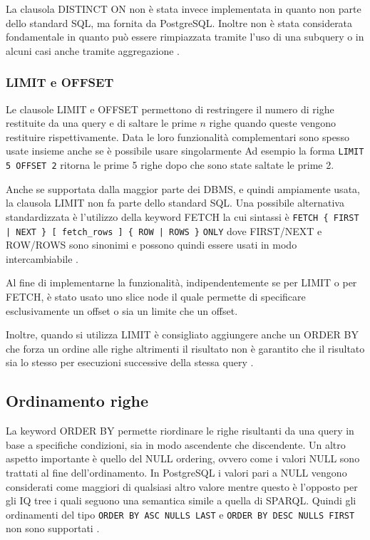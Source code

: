 La clausola DISTINCT ON non è stata invece implementata in quanto non parte dello standard SQL, ma fornita da PostgreSQL. Inoltre non è stata considerata fondamentale in quanto
può essere rimpiazzata tramite l'uso di una subquery o in alcuni casi anche tramite aggregazione \cite{PGDistinct}.
\subsubsection*{LIMIT e OFFSET}
Le clausole LIMIT e OFFSET permettono di restringere il numero di righe restituite da una query e di saltare le prime $n$ righe quando queste vengono restituire rispettivamente.
Data le loro funzionalità complementari sono spesso usate insieme anche se è possibile usare singolarmente
Ad esempio la forma \verb+LIMIT 5 OFFSET 2+ ritorna le prime 5 righe dopo che sono state saltate le prime 2.

Anche se supportata dalla maggior parte dei DBMS, e quindi ampiamente usata, la clausola LIMIT non fa parte dello standard SQL. Una possibile alternativa standardizzata è l'utilizzo
della keyword FETCH la cui sintassi è \verb+FETCH { FIRST | NEXT } [ fetch_rows ] { ROW | ROWS }+ \verb+ONLY+ dove FIRST/NEXT e ROW/ROWS sono sinonimi e possono quindi essere usati
in modo intercambiabile \cite{Fetch}.

Al fine di implementarne la funzionalità, indipendentemente se per LIMIT o per FETCH, è stato usato uno slice node il quale permette di specificare esclusivamente un offset o sia
un limite che un offset.

Inoltre, quando si utilizza LIMIT è consigliato aggiungere anche un ORDER BY che forza un ordine alle righe altrimenti il risultato non è garantito che il risultato sia lo stesso per
esecuzioni successive della stessa query \cite{PGLimit}.

\subsection{Ordinamento righe}
La keyword ORDER BY permette riordinare le righe risultanti da una query in base a specifiche condizioni, sia in modo ascendente che discendente. Un altro aspetto importante è quello del
NULL ordering, ovvero come i valori NULL sono trattati al fine dell'ordinamento. In PostgreSQL i valori pari a NULL vengono considerati come maggiori di qualsiasi altro valore mentre questo
è l'opposto per gli IQ tree i quali seguono una semantica simile a quella di SPARQL. Quindi gli ordinamenti del tipo \verb+ORDER BY ASC NULLS LAST+ e \verb+ORDER BY DESC NULLS FIRST+
non sono supportati \cite{PGOrderBY}.

